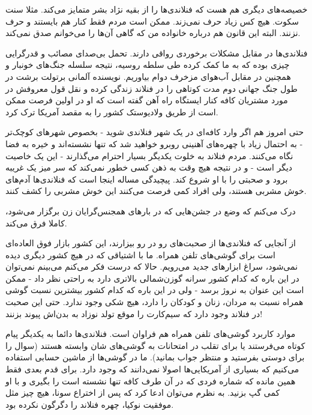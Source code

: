 خصیصه‌های دیگری هم هست که فنلاندی‌ها را از بقیه نژاد بشر متمایز
می‌کند. مثلا سنت سکوت. هیچ کس زیاد حرف نمی‌زند. ممکن است مردم فقط کنار
هم بایستند و حرف نزنند. البته این قانون هم درباره خانواده من که گاهی
آن‌ها را  می‌خوانم صدق نمی‌کند.

فنلاندی‌ها در مقابل مشکلات برخوردی رواقی‌ دارند. تحمل بی‌صدای مصائب و
قدرگرایی چیزی بوده که به ما کمک کرده طی سلطه روسیه، نتیجه سلسله جنگ‌های
خونبار و همچنین در مقابل آب‌هوای مزخرف دوام بیاوریم. نویسنده آلمانی
برتولت برشت در طول جنگ جهانی دوم مدت کوتاهی را در فنلاند زندگی کرده و
نقل قول معروفش در مورد مشتریان کافه کنار ایستگاه راه آهن گفته است که
 او در اولین فرصت ممکن است از طریق
ولادیوستک کشور را به مقصد آمریکا ترک کرد.

حتی امروز هم اگر وارد کافه‌ای در یک شهر فنلاندی شوید - بخصوص شهرهای
کوچک‌تر - به احتمال زیاد با چهره‌های آهنینی روبرو خواهید شد که تنها
نشسته‌اند و خیره به فضا نگاه می‌کنند. مردم فنلاند به خلوت یکدیگر بسیار
احترام می‌گذارند - این یک خاصیت دیگر است - و در نتیجه هیچ‌ وقت به ذهن
کسی خطور نمی‌کند که سر میز یک غریبه برود و صحبتی را با او شروع
کند. پیچیدگی مساله اینجا است که فنلاندی‌ها آدم‌های خوش مشربی هستند، ولی
افراد کمی فرصت می‌کنند این خوش مشربی را کشف کنند.

درک می‌کنم که وضع در جشن‌هایی که در بارهای همجنس‌گرایان زن برگزار می‌شود،
کاملا فرق می‌کند.

از آنجایی که فنلاندی‌ها از صحبت‌های رو در رو بیزارند، این کشور بازار فوق
العاده‌ای است برای گوشی‌های تلفن همراه. ما با اشتیاقی که در هیچ کشور
دیگری دیده نمی‌شود، سراغ ابزارهای جدید می‌رویم. حالا که درست فکر می‌کنم
می‌بینم نمی‌توان در این باره که کدام کشور سرانه گوزن‌شمالی بالاتری دارد
به راحتی نظر داد - ممکن است این عنوان به نروژ برسد - ولی در این باره
که کدام کشور بیشترین نسبت گوشی همراه نسبت به مردان، زنان و کودکان را
دارد، هیچ شکی وجود ندارد. حتی این صحبت در فنلاند وجود دارد که سیم‌کارت
را موقع تولد نوزاد به بدن‌اش پیوند بزنند!

موارد کاربرد گوشی‌های تلفن همراه هم فراوان است. فنلاندی‌ها دائما به
یکدیگر پیام کوتاه می‌فرستند یا برای تقلب در امتحانات به گوشی‌های شان
وابسته هستند (سوال را برای دوستی بفرستید و منتظر جواب بمانید). ما در
گوشی‌ها از ماشین حسابی استفاده می‌کنیم که بسیاری از آمریکایی‌ها اصولا
نمی‌دانند که وجود دارد. برای قدم بعدی فقط همین مانده که شماره فردی که
در آن طرف کافه تنها نشسته‌ است را بگیری و با او کمی گپ بزنید. به نظرم
می‌توان ادعا کرد که پس از اختراع سونا، هیچ چیز مثل موفقیت نوکیا، چهره
فنلاند را دگرگون نکرده بود.

